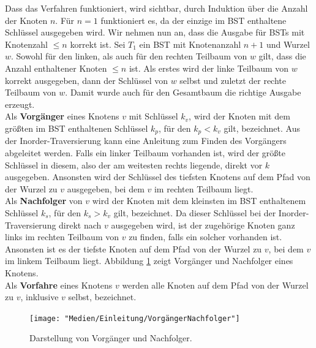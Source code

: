 \documentclass[a4paper,12pt]{article}
\begin{document}
\noindent Dass das Verfahren funktioniert, wird sichtbar, durch Induktion über die Anzahl der Knoten $n$.
Für $n = 1$ funktioniert es, da der einzige im BST enthaltene Schlüssel ausgegeben wird. Wir nehmen nun an, dass die Ausgabe für BSTs mit Knotenzahl $\leq n$ korrekt ist. Sei $T_1$ ein BST mit Knotenanzahl $n + 1$ und Wurzel $w$. Sowohl für den linken, als auch für den rechten Teilbaum von $w$ gilt, dass die Anzahl enthaltener Knoten $\leq n$ ist. Als erstes wird der linke Teilbaum von $w$ korrekt ausgegeben, dann der Schlüssel von $w$ selbst und zuletzt der rechte Teilbaum von $w$. Damit wurde auch für den Gesamtbaum die richtige
Ausgabe erzeugt. \\
Als \textbf{Vorgänger} eines Knotens $v$ mit Schlüssel $k_v$, wird der Knoten mit dem größten im BST enthaltenen Schlüssel $k_p$, für den $k_p < k_v$ gilt, bezeichnet. Aus der Inorder-Traversierung kann eine Anleitung zum Finden des Vorgängers abgeleitet werden. Falls ein linker Teilbaum vorhanden ist, wird der größte Schlüssel in diesem, also der am weitesten rechts liegende, direkt vor $k$ ausgegeben. Ansonsten wird der Schlüssel des tiefsten Knotens auf dem Pfad von der Wurzel zu $v$ ausgegeben, bei dem $v$ im rechten Teilbaum liegt. \\
Als \textbf{Nachfolger} von $v$ wird der Knoten mit dem kleinsten im BST enthaltenem Schlüssel $k_s$, für den $k_s > k_v$ gilt, bezeichnet. Da dieser Schlüssel bei der Inorder-Traversierung direkt nach $v$ ausgegeben wird, ist der zugehörige Knoten ganz links im rechten Teilbaum von $v$ zu finden, falls ein solcher vorhanden ist. Ansonsten ist es der tiefste Knoten auf dem Pfad von der Wurzel zu $v$, bei dem $v$ im linkem Teilbaum liegt. Abbildung \ref{fig:VorgängerNachfolger} zeigt Vorgänger und Nachfolger eines Knotens.\\
 Als \textbf{Vorfahre} eines Knotens $v$ werden alle Knoten auf dem Pfad von der Wurzel zu $v$, inklusive $v$ selbst, bezeichnet. 

\begin{figure}[H]
	\centering
	\texttt{[image: "Medien/Einleitung/VorgängerNachfolger"]}
	\caption{Darstellung von Vorgänger und Nachfolger. }
	\label{fig:VorgängerNachfolger}
\end{figure}
\end{document}

